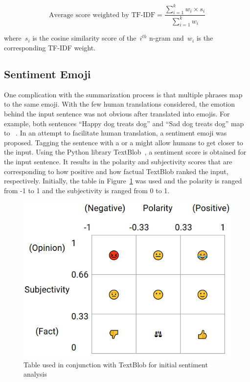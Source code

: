\documentclass{article}[10]
\newcommand*{\img}[1]{%
  \raisebox{-.3\baselineskip}{%
    \texttt{[image: \#1]}%
  }%
}
\begin{document}
\begin{equation}
  \textrm{Average score weighted by
    TF-IDF} = \frac{\sum_{i=1}^{k}w_{i}\times s_i}{\sum_{i=1}^{k}w_{i}}\label{eq:averageTF-IDFScore}
\end{equation}

where~\(s_{i}\) is the cosine similarity score of the~\(i^{th}\) n-gram and~\(w_{i}\) is the corresponding TF-IDF weight.

\subsection{Sentiment Emoji\label{sec:sentimentEmoji}}

One complication with the summarization process is that multiple phrases map to the same emoji. With the few human translations considered, the emotion behind the input sentence was not obvious after translated into emojis. For example, both sentences ``Happy dog treats dog'' and ``Sad dog treats dog'' map to~\img{emojis/1f415.png}\img{emojis/1f368.png}\img{emojis/1f415.png}. In an attempt to facilitate human translation, a sentiment emoji was proposed. Tagging the sentence with a \img{emojis/1f60a.png} or a \img{emojis/1f641.png} might allow humans to get closer to the input. Using the Python library TextBlob~\cite{TextBlob}, a sentiment score is obtained for the input sentence. It results in the polarity and subjectivity scores that are corresponding to how positive and how factual TextBlob ranked the input, respectively. Initially, the table in Figure~\ref{fig:sentimentTable} was used and the polarity is ranged from -1 to 1 and the subjectivity is ranged from 0 to 1.

\begin{figure}[H]
  \begin{center}
    \includegraphics[width=0.90\columnwidth]{figures/sentiment_table1.png}
    \caption{Table used in conjunction with TextBlob for initial sentiment
      analysis\label{fig:sentimentTable}}
  \end{center}
\end{figure}
\end{document}
